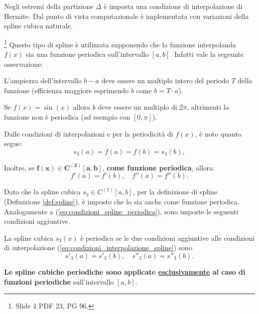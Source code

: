 Negli estremi della partizione $\Delta$ è imposta una condizione di interpolazione di Hermite.
Dal punto di vista computazionale è implementata con variazioni della spline cubica naturale.

 \footnote{Slide 4 PDF 23, PG 96.}
Questo tipo di spline è utilizzata supponendo che la funzione interpolanda $f(x)$ sia una funzione periodica sull'intervallo $[a,b]$. Infatti vale la segeunte osservazione:

\begin{remark}
    L'ampiezza dell'intervallo $b-a$ deve essere un multiplo intero del periodo $T$ della funzione (efficienza maggiore esprimendo $b$ come $b=T\cdot a$).
\end{remark}

\begin{example}
    Se $f(x)=\sin(x)$ allora $b$ deve essere un multiplo di $2\pi$, altrimenti la funzione non è periodica (ad esempio con $[0,\pi]$).
\end{example}

Dalle condizioni di interpolazioni e per la periodicità di $f(x)$, è noto quanto segue:
\begin{equation*}
    s_3(a)=f(a)=f(b)=s_3(b),
\end{equation*}

Inoltre, se $\boldsymbol{f(x)\in C^{(2)}[a,b]}$, \textbf{come funzione periodica}, allora:
\begin{equation}\label{eq:condizioni_spline_periodica}
    f'(a)=f'(b),\quad f''(a)=f''(b).
\end{equation}

Dato che la spline cubica $s_3\in C^{(2)}[a,b]$, per la definizione di spline (Definizione \ref{def:spline}), è imposto che lo sia anche come funzione periodica. Analogamente a (\ref{eq:condizioni_spline_periodica}), sono imposte le seguenti condizioni aggiuntive.

\begin{definition}
	La spline cubica $s_3(x)$ è periodica se le due condizioni aggiuntive alle condizioni di interpolazione (\ref{eq:condizioni_interpolazione_spline}) sono
	\begin{equation}\label{eq:condizioni_spline_cubica_periodica}
	    \boxed{s'_3(a)=s'_3(b),\quad s''_3(a)=s''_3(b).}
	\end{equation}
\end{definition}

\begin{remark}
    \textbf{Le spline cubiche periodiche sono applicate \ul{esclusivamente} al caso di funzioni periodiche} sull'intervallo $[a,b]$.
\end{remark}

